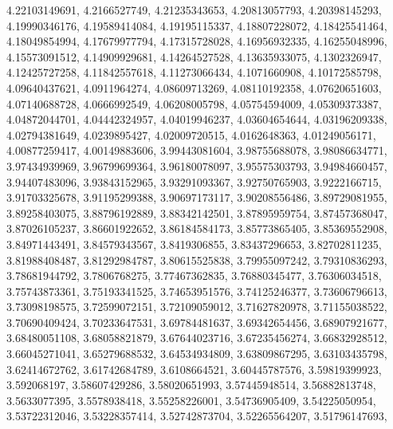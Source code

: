 \begin{code}
\begin{hide}
{     4.22103149691,      4.2166527749,     4.21235343653,
     4.20813057793,     4.20398145293,     4.19990346176,
     4.19589414084,     4.19195115337,     4.18807228072,
     4.18425541464,     4.18049854994,     4.17679977794,
     4.17315728028,     4.16956932335,     4.16255048996,
     4.15573091512,     4.14909929681,     4.14264527528,
     4.13635933075,      4.1302326947,     4.12425727258,
     4.11842557618,     4.11273066434,      4.1071660908,
     4.10172585798,     4.09640437621,      4.0911964274,
     4.08609713269,     4.08110192358,     4.07620651603,
     4.07140688728,      4.0666992549,     4.06208005798,
     4.05754594009,     4.05309373387,     4.04872044701,
     4.04442324957,     4.04019946237,     4.03604654644,
     4.03196209338,     4.02794381649,      4.0239895427,
     4.02009720515,      4.0162648363,     4.01249056171,
     4.00877259417,     4.00149883606,     3.99443081604,
     3.98755688078,     3.98086634771,     3.97434939969,
     3.96799699364,     3.96180078097,     3.95575303793,
     3.94984660457,     3.94407483096,     3.93843152965,
     3.93291093367,     3.92750765903,      3.9222166715,
     3.91703325678,     3.91195299388,     3.90697173117,
     3.90208556486,     3.89729081955,     3.89258403075,
     3.88796192889,     3.88342142501,     3.87895959754,
     3.87457368047,     3.87026105237,     3.86601922652,
     3.86184584173,     3.85773865405,     3.85369552908,
     3.84971443491,     3.84579343567,      3.8419306855,
     3.83437296653,     3.82702811235,     3.81988408487,
     3.81292984787,     3.80615525838,     3.79955097242,
     3.79310836293,     3.78681944792,      3.7806768275,
     3.77467362835,     3.76880345477,     3.76306034518,
     3.75743873361,     3.75193341525,     3.74653951576,
     3.74125246377,     3.73606796613,     3.73098198575,
     3.72599072151,     3.72109059012,     3.71627820978,
     3.71155038522,     3.70690409424,     3.70233647531,
     3.69784481637,     3.69342654456,     3.68907921677,
     3.68480051108,     3.68058821879,     3.67644023716,
     3.67235456274,     3.66832928512,     3.66045271041,
     3.65279688532,     3.64534934809,     3.63809867295,
     3.63103435798,     3.62414672762,     3.61742684789,
      3.6108664521,     3.60445787576,     3.59819399923,
       3.592068197,     3.58607429286,     3.58020651993,
     3.57445948514,     3.56882813748,      3.5633077395,
      3.5578938418,     3.55258226001,     3.54736905409,
     3.54225050954,     3.53722312046,     3.53228357414,
     3.52742873704,     3.52265564207,     3.51796147693,
}
\end{hide}
\end{code}
